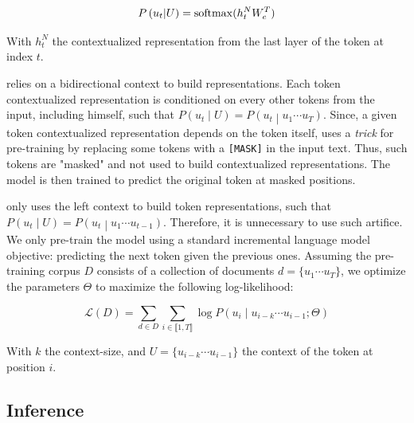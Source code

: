\begin{equation}
    P\left(u_t \middle| U \right) = \softmax(h_t^N W_e^T) \labeq{generative:token-proba} \\
\end{equation}

With $h_t^N$ the contextualized representation from the last layer of the token at index $t$. 

\bert relies on a bidirectional context to build representations. Each token contextualized representation is conditioned on every other tokens from the input, including himself, such that $P\left(u_t \middle| U \right) = P\left(u_t \middle| u_1 \cdots u_T \right)$. Since, a given token contextualized representation depends on the token itself, \bert uses a \textit{trick} for pre-training by replacing some tokens with a \texttt{[MASK]} in the input text. Thus, such tokens are "masked" and not used to build contextualized representations. The model is then trained to predict the original token at masked positions. 

\gpt only uses the left context to build token representations, such that $P\left(u_t \middle| U \right) = P\left(u_t \middle| u_1 \cdots u_{t-1} \right)$. Therefore, it is unnecessary to use such artifice. We only pre-train the model using a standard incremental language model objective: predicting the next token given the previous ones. Assuming the pre-training corpus $D$ consists of a collection of documents $d=\{u_1 \cdots u_T\}$, we optimize the \gpt parameters $\Theta$ to maximize the following log-likelihood:%

\begin{equation}
    \mathcal{L}(D) = \sum_{d \in D}\sum_{i \in \llbracket 1, T \rrbracket} \log P\left(u_{i} \middle| u_{i-k} \cdots u_{i-1}  ; \Theta\right)
\end{equation}

With $k$ the context-size, and $U=\{u_{i-k} \cdots u_{i-1}\}$ the context of the token at position $i$.


\subsection{Inference}

